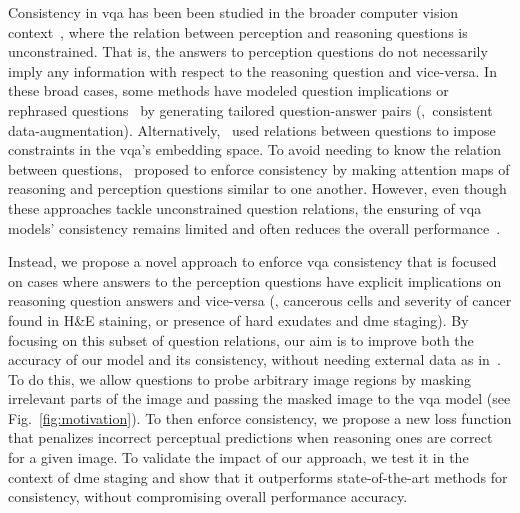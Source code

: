 \nocite{wang2021image}

Consistency in \gls{vqa} has been been studied in the broader computer vision context~\cite{goel2021iq,gokhale2020vqa,ray2019sunny,ribeiro2019red,shah2019cycle}, where the relation between perception and reasoning questions is unconstrained. That is, the answers to perception questions do not necessarily imply any information with respect to the reasoning question and vice-versa. In these broad cases, some methods have modeled question implications \cite{ray2019sunny,ribeiro2019red} or rephrased questions~\cite{shah2019cycle} by generating tailored question-answer pairs (\eg,~consistent data-augmentation). Alternatively,~\cite{gokhale2020vqa,teney2019incorporating,yuan2021perception} used relations between questions to impose constraints in the \gls{vqa}'s embedding space. To avoid needing to know the relation between questions,~\cite{selvaraju2020squinting} proposed to enforce consistency by making attention maps of reasoning and perception questions similar to one another. 
However, even though these approaches tackle unconstrained question relations, the ensuring of \gls{vqa} models' consistency remains limited and often reduces the overall performance~\cite{selvaraju2020squinting}.  

Instead, we propose a novel approach to enforce \gls{vqa} consistency that is focused on cases where answers to the perception questions have explicit implications on reasoning question answers and vice-versa (\eg, cancerous cells and severity of cancer found in H\&E staining, or presence of hard exudates and \gls{dme} staging). By focusing on this subset of question relations, our aim is to improve both the accuracy of our model and its consistency, without needing external data as in~\cite{ribeiro2019red,Nguyen19,goel2021iq}. To do this, we allow questions to probe arbitrary image regions by masking irrelevant parts of the image and passing the masked image to the \gls{vqa} model (see Fig.~\ref{fig:motivation}). To then enforce consistency, we propose a new loss function that penalizes incorrect perceptual predictions when reasoning ones are correct for a given image. To validate the impact of our approach, we test it in the context of \gls{dme} staging and show that it outperforms state-of-the-art methods for consistency, without compromising overall performance accuracy. 